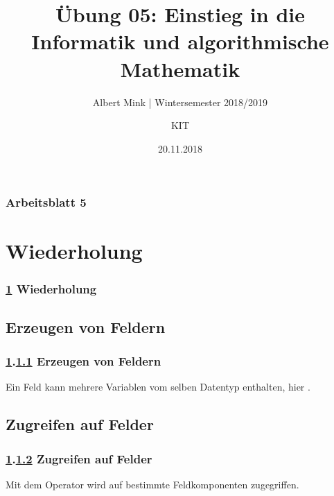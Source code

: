 \documentclass[c,18pt]{beamer}
\date{20.11.2018}
\title[Übung 05: Einstieg in die Informatik und algorithmische]
  {Übung 05: Einstieg in die Informatik und algorithmische \\ Mathematik}
\subtitle{Albert Mink | Wintersemester 2018/2019}
\author[Albert Mink, ]{KIT}
\institute[Institut für Angewandte und Numerische Mathematik (IANM)]{Institut für Angewandte und Numerische Mathematik}
\begin{document}
\begin{frame}
  \maketitle
\end{frame}


\begin{frame}
  \frametitle{Arbeitsblatt 5}%
\tableofcontents
\end{frame}
\setcounter{exercise}{20}


\section{Wiederholung}\label{K:wdh}
\begin{frame}
  \frametitle{\ref{K:wdh} Wiederholung}%
\tableofcontents[current]
\end{frame}

\def\stitle{Erzeugen von Feldern}
\subsection{\stitle}\label{S:Erzeugen}
\begin{frame}[t]%
  \frametitle{\ref{K:wdh}.\ref{S:Erzeugen} \stitle}
\medskip

Ein Feld kann mehrere Variablen vom selben Datentyp enthalten, hier .


\end{frame}


\def\stitle{Zugreifen auf Felder}
\subsection{\stitle}\label{S:Zugreifen}
\begin{frame}[t]%
  \frametitle{\ref{K:wdh}.\ref{S:Zugreifen} \stitle}
\medskip

Mit dem Operator \code{[]} wird auf bestimmte Feldkomponenten zugegriffen.


\end{frame}
\end{document}
